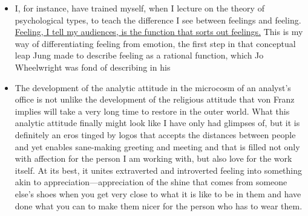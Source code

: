 \begin{table}[h]
\caption[Once More with Feeling~\verified]{Beebe: Once More with Feeling\newline
\verified~\textcolor{gray}{\small Source: Page 9 and 15, Section ``Once More with Feeling'' from Beebe~\cite{beebe}.}}

\begin{itemize}
\item

I, for instance, have trained myself, when I lecture on the theory of
psychological types, to teach the difference I see between feelings and
feeling. \ul{Feeling, I tell my audiences, is the function that sorts out feelings.}
This is my way of differentiating feeling from emotion, the first step in that
conceptual leap Jung made to describe feeling as a rational function, which Jo
Wheelwright was fond of describing in his

\item

The development of the analytic attitude in the microcosm of an analyst’s
office is not unlike the development of the religious attitude that von Franz
implies will take a very long time to restore in the outer world. What this
analytic attitude finally might look like I have only had glimpses of, but it
is definitely an eros tinged by logos that accepts the distances between people
and yet enables sane-making greeting and meeting and that is filled not only
with affection for the person I am working with, but also love for the work
itself. At its best, it unites extraverted and introverted feeling into
something akin to appreciation—appreciation of the shine that comes from
someone else’s shoes when you get very close to what it is like to be in them
and have done what you can to make them nicer for the person who has to wear
them.

\end{itemize}
\end{table}
